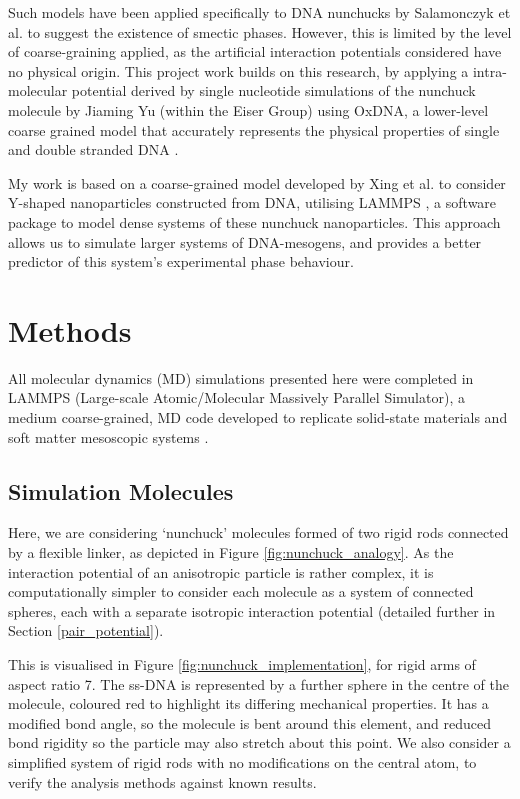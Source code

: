 \documentclass[11pt, a4paper]{article} %
\begin{document}
Such models have been applied specifically to DNA nunchucks by Salamonczyk et al. \cite{Salamonczyk2016} to suggest the existence of smectic phases. However, this is limited by the level of coarse-graining applied, as the artificial interaction potentials considered have no physical origin. This project work builds on this research, by applying a intra-molecular potential derived by single nucleotide simulations of the nunchuck molecule by Jiaming Yu (within the Eiser Group) using OxDNA, a lower-level coarse grained model that accurately represents the physical properties of single and double stranded DNA \cite{OxDNA}.

My work is based on a coarse-grained model developed by Xing et al. \cite{Xing2019} to consider Y-shaped nanoparticles constructed from DNA, utilising LAMMPS \cite{LAMMPS}, a software package to model dense systems of these nunchuck nanoparticles. This approach allows us to simulate larger systems of DNA-mesogens, and provides a better predictor of this system’s experimental phase behaviour.

\section{Methods} \label{sec:Methods}
All molecular dynamics (MD) simulations presented here were completed in LAMMPS (Large-scale Atomic/Molecular Massively Parallel Simulator), a medium coarse-grained, MD code developed to replicate solid-state materials and soft matter mesoscopic systems \cite{Plimpton1995, LAMMPS}.



\subsection{Simulation Molecules} \label{sec:SimMolecules}
Here, we are considering `nunchuck' molecules formed of two rigid rods connected by a flexible linker, as depicted in Figure \ref{fig:nunchuck_analogy}. As the interaction potential of an anisotropic particle is rather complex, it is computationally simpler to consider each molecule as a system of connected spheres, each with a separate isotropic interaction potential (detailed further in Section \ref{pair_potential}).

This is visualised in Figure \ref{fig:nunchuck_implementation}, for rigid arms of aspect ratio 7. The ss-DNA is represented by a further sphere in the centre of the molecule, coloured red to highlight its differing mechanical properties. It has a modified bond angle, so the molecule is bent around this element, and reduced bond rigidity so the particle may also stretch about this point. We also consider a simplified system of rigid rods with no modifications on the central atom, to verify the analysis methods against known results.
\end{document}
